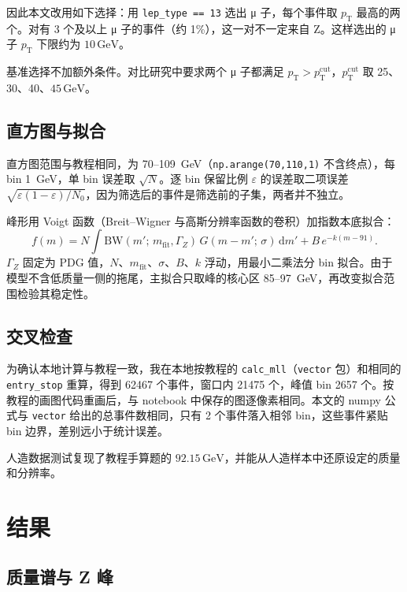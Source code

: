\documentclass[11pt,a4paper,fontset=windows]{ctexart}
\newcommand{\pT}{p_{\mathrm{T}}}
\newcommand{\GeV}{\,\mathrm{GeV}}
\begin{document}
因此本文改用如下选择：用 \texttt{lep\_type == 13} 选出 μ 子，每个事件取 $\pT$ 最高的两个。对有 3 个及以上 μ 子的事件（约 1\%），这一对不一定来自 Z。这样选出的 μ 子 $\pT$ 下限约为 $10\GeV$。

基准选择不加额外条件。对比研究中要求两个 μ 子都满足 $\pT>\pT^{\mathrm{cut}}$，$\pT^{\mathrm{cut}}$ 取 25、30、40、$45\GeV$。

\subsection{直方图与拟合}

直方图范围与教程相同，为 70--109~GeV（\texttt{np.arange(70,110,1)} 不含终点），每 bin 1~GeV，单 bin 误差取 $\sqrt{N}$。逐 bin 保留比例 $\varepsilon$ 的误差取二项误差 $\sqrt{\varepsilon(1-\varepsilon)/N_0}$，因为筛选后的事件是筛选前的子集，两者并不独立。

峰形用 Voigt 函数（Breit--Wigner 与高斯分辨率函数的卷积）加指数本底拟合：
\begin{equation}
f(m)=N\int \mathrm{BW}(m';\,m_{\mathrm{fit}},\Gamma_Z)\,G(m-m';\,\sigma)\,\mathrm{d}m'+B\,e^{-k(m-91)} .
\end{equation}
$\Gamma_Z$ 固定为 PDG 值，$N$、$m_{\mathrm{fit}}$、$\sigma$、$B$、$k$ 浮动，用最小二乘法分 bin 拟合。由于模型不含低质量一侧的拖尾，主拟合只取峰的核心区 85--97~GeV，再改变拟合范围检验其稳定性。

\subsection{交叉检查}

为确认本地计算与教程一致，我在本地按教程的 \texttt{calc\_mll}（\texttt{vector} 包）和相同的 \texttt{entry\_stop} 重算，得到 62467 个事件，窗口内 21475 个，峰值 bin 2657 个。按教程的画图代码重画后，与 notebook 中保存的图逐像素相同。本文的 numpy 公式与 \texttt{vector} 给出的总事件数相同，只有 2 个事件落入相邻 bin，这些事件紧贴 bin 边界，差别远小于统计误差。

人造数据测试复现了教程手算题的 $92.15\GeV$，并能从人造样本中还原设定的质量和分辨率。

\section{结果}

\subsection{质量谱与 Z 峰}
\end{document}
